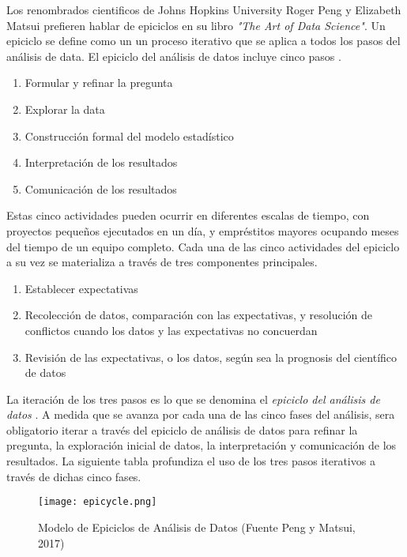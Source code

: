 Los renombrados cientificos de Johns Hopkins University Roger Peng y Elizabeth Matsui prefieren hablar de epiciclos en su libro \emph{"The Art of Data Science"}. Un epiciclo se define como un un proceso iterativo que se aplica a todos los pasos del análisis de data. El epiciclo del análisis de datos incluye cinco pasos \cite{pengMatsui}.

\begin{enumerate}
	\item Formular y refinar la pregunta
	\item Explorar la data
	\item Construcción formal del modelo estadístico
	\item Interpretación de los resultados
	\item Comunicación de los resultados
\end{enumerate}

Estas cinco actividades pueden ocurrir en diferentes escalas de tiempo, con proyectos pequeños ejecutados en un día, y empréstitos mayores ocupando meses del tiempo de un equipo completo. Cada una de las cinco actividades del epiciclo a su vez se materializa a través de tres componentes principales.

\begin{enumerate}
	\item Establecer expectativas
	\item Recolección de datos, comparación con las expectativas, y resolución de conflictos cuando los datos y las expectativas no concuerdan
	\item Revisión de las expectativas, o los datos, según sea la prognosis del científico de datos
\end{enumerate}

La iteración de los tres pasos es lo que se denomina el \emph{epiciclo del análisis de datos} \cite{pengMatsui}. A medida que se avanza por cada una de las cinco fases del análisis, sera obligatorio iterar a través del epiciclo de análisis de datos para refinar la pregunta, la exploración inicial de datos, la interpretación y comunicación de los resultados. La siguiente tabla profundiza el uso de los tres pasos iterativos a través de dichas cinco fases. 

\begin{figure}[h!]
	\centering
	\texttt{[image: epicycle.png]}
	\caption{Modelo de Epiciclos de Análisis de Datos (Fuente Peng y Matsui, 2017)}
\end{figure}

